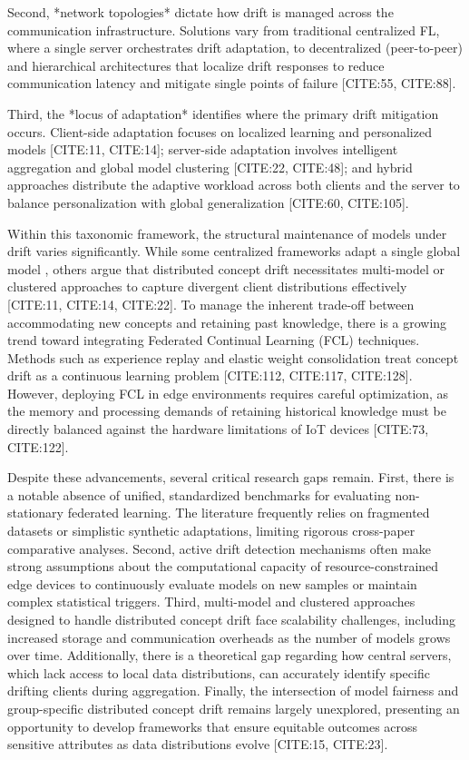 \documentclass[journal]{IEEEtran}
\begin{document}
Second, *network topologies* dictate how drift is managed across the communication infrastructure. Solutions vary from traditional centralized FL, where a single server orchestrates drift adaptation, to decentralized (peer-to-peer) and hierarchical architectures that localize drift responses to reduce communication latency and mitigate single points of failure [CITE:55, CITE:88]. 

Third, the *locus of adaptation* identifies where the primary drift mitigation occurs. Client-side adaptation focuses on localized learning and personalized models [CITE:11, CITE:14]; server-side adaptation involves intelligent aggregation and global model clustering [CITE:22, CITE:48]; and hybrid approaches distribute the adaptive workload across both clients and the server to balance personalization with global generalization [CITE:60, CITE:105].

Within this taxonomic framework, the structural maintenance of models under drift varies significantly. While some centralized frameworks adapt a single global model \cite{Casado2021}, others argue that distributed concept drift necessitates multi-model or clustered approaches to capture divergent client distributions effectively [CITE:11, CITE:14, CITE:22]. To manage the inherent trade-off between accommodating new concepts and retaining past knowledge, there is a growing trend toward integrating Federated Continual Learning (FCL) techniques. Methods such as experience replay and elastic weight consolidation treat concept drift as a continuous learning problem [CITE:112, CITE:117, CITE:128]. However, deploying FCL in edge environments requires careful optimization, as the memory and processing demands of retaining historical knowledge must be directly balanced against the hardware limitations of IoT devices [CITE:73, CITE:122].

Despite these advancements, several critical research gaps remain. First, there is a notable absence of unified, standardized benchmarks for evaluating non-stationary federated learning. The literature frequently relies on fragmented datasets or simplistic synthetic adaptations, limiting rigorous cross-paper comparative analyses. Second, active drift detection mechanisms often make strong assumptions about the computational capacity of resource-constrained edge devices to continuously evaluate models on new samples or maintain complex statistical triggers. Third, multi-model and clustered approaches designed to handle distributed concept drift face scalability challenges, including increased storage and communication overheads as the number of models grows over time. Additionally, there is a theoretical gap regarding how central servers, which lack access to local data distributions, can accurately identify specific drifting clients during aggregation. Finally, the intersection of model fairness and group-specific distributed concept drift remains largely unexplored, presenting an opportunity to develop frameworks that ensure equitable outcomes across sensitive attributes as data distributions evolve [CITE:15, CITE:23].
\end{document}

